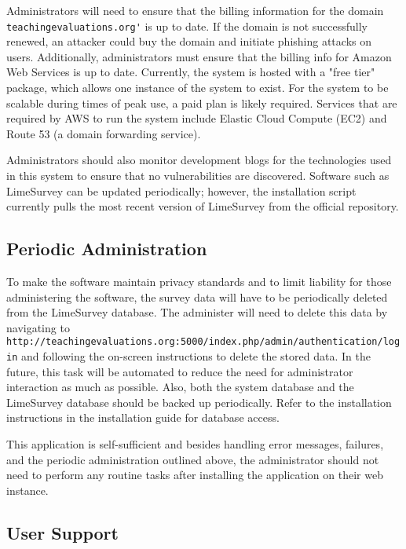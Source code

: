 \documentclass{article}
\begin{document}
Administrators will need to ensure that the billing information for the domain \verb|teachingevaluations.org'| is up to date. If the domain is not successfully renewed, an attacker could buy the domain and initiate phishing attacks on users. Additionally, administrators must ensure that the billing info for Amazon Web Services is up to date. Currently, the system is hosted with a "free tier" package, which allows one instance of the system to exist. For the system to be scalable during times of peak use, a paid plan is likely required. Services that are required by AWS to run the system include Elastic Cloud Compute (EC2) and Route 53 (a domain forwarding service). 

Administrators should also monitor development blogs for the technologies used in this system to ensure that no vulnerabilities are discovered. Software such as LimeSurvey can be updated periodically; however, the installation script currently pulls the most recent version of LimeSurvey from the official repository.  

\subsection{Periodic Administration}

To make the software maintain privacy standards and to limit liability for those administering the software, the survey data will have to be periodically deleted from the LimeSurvey database.  The administer will need to delete this data by navigating to \verb|http://teachingevaluations.org:5000/index.php/admin/|\newline \verb|authentication/login| and following the on-screen instructions to delete the stored data. In the future, this task will be automated to reduce the need for administrator interaction as much as possible. Also, both the system database and the LimeSurvey database should be backed up periodically. Refer to the installation instructions in the installation guide for database access.

This application is self-sufficient and besides handling error messages, failures, and the periodic administration outlined above, the administrator should not need to perform any routine tasks after installing the application on their web instance.

\subsection{User Support}
\end{document}

